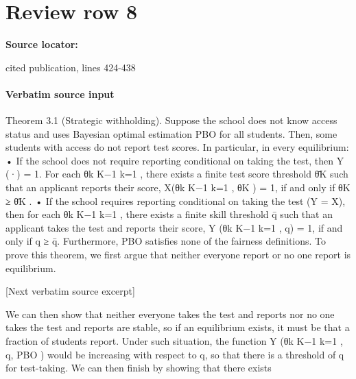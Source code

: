 \documentclass[10pt]{article}
\begin{document}
\section*{Review row 8}
\textbf{Source locator:} {\footnotesize\raggedright cited publication, lines 424-\allowbreak{}438\par}
\paragraph{Verbatim source input}
\begin{ReviewVerbatim}
Theorem 3.1 (Strategic withholding). Suppose the school does not know access status and uses
Bayesian optimal estimation PBO for all students. Then, some students with access do not report
test scores. In particular, in every equilibrium:
• If the school does not require reporting conditional on taking the test, then Y (·) = 1. For each
{θk }K−1
k=1 , there exists a finite test score threshold θ̄K such that an applicant reports their score,
X({θk }K−1
k=1 , θK ) = 1, if and only if θK ≥ θ̄K .
• If the school requires reporting conditional on taking the test (Y = X), then for each {θk }K−1
k=1 ,
there exists a finite skill threshold q̄ such that an applicant takes the test and reports their
score, Y ({θk }K−1
k=1 , q) = 1, if and only if q ≥ q̄.
Furthermore, PBO satisfies none of the fairness definitions.
To prove this theorem, we ﬁrst argue that neither everyone report or no one report is equilibrium.

[Next verbatim source excerpt]

We can then show that neither everyone takes the test and reports nor no one takes the test
and reports are stable, so if an equilibrium exists, it must be that a fraction of students report.
Under such situation, the function Y ({θk }K−1
k=1 , q, PBO ) would be increasing with respect to q, so
that there is a threshold of q for test-taking. We can then ﬁnish by showing that there exists
\end{ReviewVerbatim}
\end{document}
